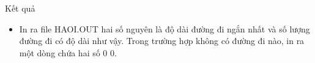 Kết quả
\begin{itemize}
	\item In ra file HAOI.OUT hai số nguyên là độ dài đường đi ngắn nhất và số lượng đường đi có độ dài như vậy. Trong trường hợp không có đường đi nào, in ra một dòng chứa hai số 0 0.
\end{itemize}